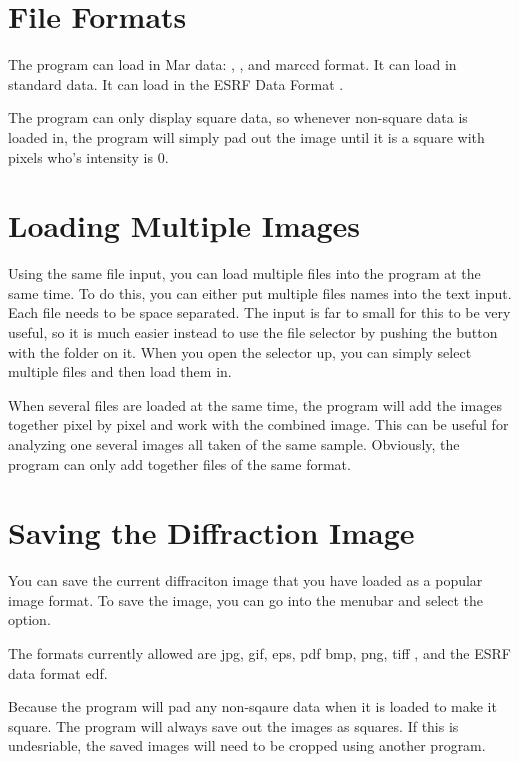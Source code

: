 \section{File Formats}

The program can load in Mar data: , 
, and  marccd format.
It can load in standard  data. 
It can load in the ESRF Data Format 
.

The program can only display square data, so whenever non-square
data is loaded in, the program will simply pad out the image until
it is a square with pixels who's intensity is 0. 


\section{Loading Multiple Images}

Using the same file input, you can load multiple files into 
the program at the same time. To do this, you can either put multiple
files names into the  text input. Each file needs to
be space separated. The input is far to small for this to be very useful,
so it is much easier instead to use the file selector by pushing the
button with the folder on it. When you open the selector up, you can 
simply select multiple files and then load them in.

When several files are loaded at the same time, the program will add
the images together pixel by pixel and work with the combined image.
This can be useful for analyzing one several images all taken of the
same sample. Obviously, the program can only add together files of
the same format.

\section{Saving the Diffraction Image}
You can save the current diffraciton image that you have loaded 
as a popular image format. To save the image, you can go into
the  menubar and select the  option.

The formats currently allowed are jpg, gif, eps, pdf bmp, png, 
tiff , and the ESRF data format edf.

Because the program will pad any non-sqaure data when
it is loaded to make it square. The program will always save out 
the images as squares. If this is undesriable, the saved images
will need to be cropped using another program.

